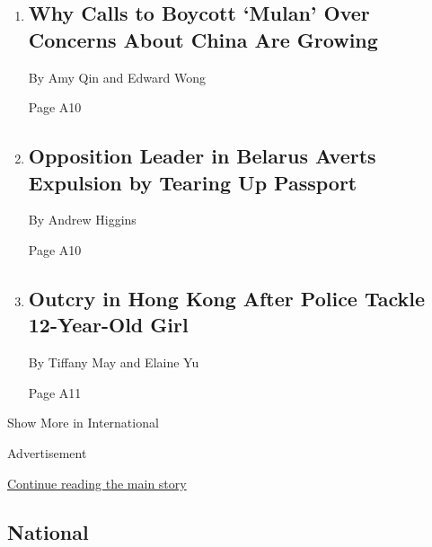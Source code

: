 \begin{enumerate}
\def\labelenumi{\arabic{enumi}.}
\item
  \href{/2020/09/08/world/asia/china-mulan-xinjiang.html}{}

  \hypertarget{why-calls-to-boycott-mulan-over-concerns-about-china-are-growing}{%
  \subsection{Why Calls to Boycott `Mulan' Over Concerns About China Are
  Growing}\label{why-calls-to-boycott-mulan-over-concerns-about-china-are-growing}}

  By Amy Qin and Edward Wong

  Page A10
\item
  \href{/2020/09/08/world/europe/belarus-maria-kolesnikova.html}{}

  \hypertarget{opposition-leader-in-belarus-averts-expulsion-by-tearing-up-passport-1}{%
  \subsection{Opposition Leader in Belarus Averts Expulsion by Tearing
  Up
  Passport}\label{opposition-leader-in-belarus-averts-expulsion-by-tearing-up-passport-1}}

  By Andrew Higgins

  Page A10
\item
  \href{/2020/09/08/world/asia/hong-kong-girl-police-video.html}{}

  \hypertarget{outcry-in-hong-kong-after-police-tackle-12-year-old-girl}{%
  \subsection{Outcry in Hong Kong After Police Tackle 12-Year-Old
  Girl}\label{outcry-in-hong-kong-after-police-tackle-12-year-old-girl}}

  By Tiffany May and Elaine Yu

  Page A11
\end{enumerate}

Show More in International

Advertisement

\protect\hyperlink{after-mid2}{Continue reading the main story}

\hypertarget{national}{%
\subsection{National}\label{national}}

